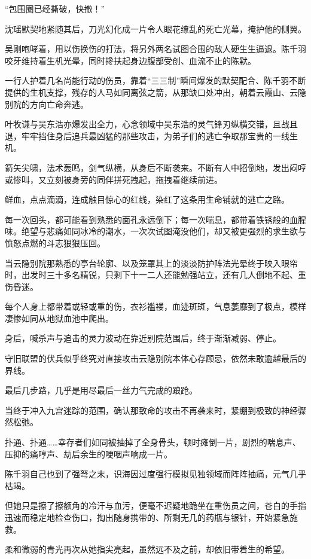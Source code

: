 “包围圈已经撕破，快撤！”

沈瑶默契地紧随其后，刀光幻化成一片令人眼花缭乱的死亡光幕，掩护他的侧翼。

吴刚咆哮着，用以伤换伤的打法，将另外两名试图合围的敌人硬生生逼退。陈千羽咬牙维持着生机光晕，同时搀扶起身边腹部受创、血流不止的陈默。

一行人护着几名尚能行动的伤员，靠着“三三制”瞬间爆发的默契配合、陈千羽不断提供的生机支撑，残存的人马如同离弦之箭，从那缺口处冲出，朝着云霞山、云隐别院的方向亡命奔逃。

叶牧谦与吴东浩亦爆发出全力，心念领域中吴东浩的灵气锋刃纵横交错，且战且退，牢牢挡住身后追兵最凶猛的那些攻击，为弟子们的逃亡争取那宝贵的一线生机。

箭矢尖啸，法术轰鸣，剑气纵横，从身后不断袭来。不断有人中招倒地，发出闷哼或惨叫，又立刻被身旁的同伴拼死拽起，拖拽着继续前进。

鲜血，点点滴滴，连成触目惊心的红线，染红了这条用生命铺就的逃亡之路。

每一次回头，都可能看到熟悉的面孔永远倒下；每一次喘息，都带着铁锈般的血腥味。绝望与悲痛如同冰冷的潮水，一次次试图淹没他们，却又被更强烈的求生欲与愤怒点燃的斗志狠狠压回。

当云隐别院那熟悉的亭台轮廓、以及笼罩其上的淡淡防护阵法光晕终于映入眼帘时，出发时三十多名精锐，只剩下十一二人还能勉强站立，还有几人倒地不起、重伤昏迷。

每个人身上都带着或轻或重的伤，衣衫褴褛，血迹斑斑，气息萎靡到了极点，模样凄惨如同从地狱血池中爬出。

身后，喊杀声与追击的灵力波动在靠近别院范围后，终于渐渐减弱、停止。

守旧联盟的伏兵似乎终究对直接攻击云隐别院本体心存顾忌，依然未敢逾越最后的界线。

最后几步路，几乎是用尽最后一丝力气完成的踉跄。

\vspace{2em}

当终于冲入九宫迷踪的范围，确认那致命的攻击不再袭来时，紧绷到极致的神经骤然松弛。

扑通、扑通……幸存者们如同被抽掉了全身骨头，顿时瘫倒一片，剧烈的喘息声、压抑的痛哼声、劫后余生的哽咽声响成一片。

陈千羽自己也到了强弩之末，识海因过度强行模拟见独领域而阵阵抽痛，元气几乎枯竭。

但她只是擦了擦额角的冷汗与血污，便毫不迟疑地跪坐在重伤员之间，苍白的手指迅速而稳定地检查伤口，掏出随身携带的、所剩无几的药瓶与银针，开始紧急施救。

柔和微弱的青光再次从她指尖亮起，虽然远不及之前，却依旧带着生的希望。

